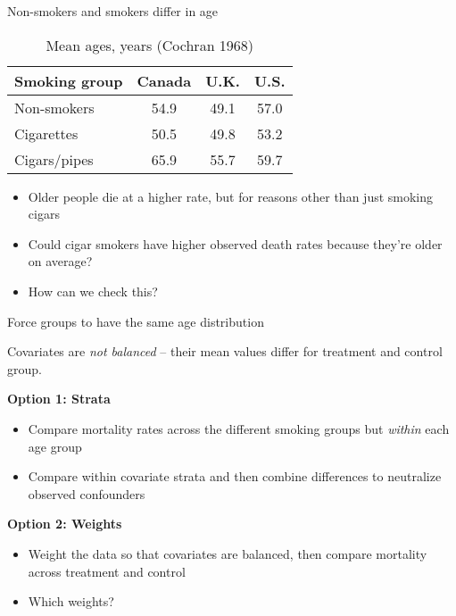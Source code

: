 \documentclass{beamer}
\begin{document}
\begin{frame}{Non-smokers and smokers differ in age}
	


	\begin{table}\centering
		\caption{Mean ages, years (Cochran 1968)}
		\begin{center}
		\begin{tabular}{lccc}
		\hline \hline
		\multicolumn{1}{l}{Smoking group}&
		\multicolumn{1}{c}{Canada}&
		\multicolumn{1}{c}{U.K.}&
		\multicolumn{1}{c}{U.S.}\\
		\hline
		Non-smokers & 54.9 & 49.1 & 57.0\\
		Cigarettes & 50.5 & 49.8 & 53.2 \\
		Cigars/pipes & 65.9 & 55.7 & 59.7\\
		\hline
		\end{tabular}
		\end{center}
	\end{table}
	
	\begin{itemize}
	\item Older people die at a higher rate, but for reasons other than just smoking cigars
	\item Could cigar smokers have higher observed death rates because they're older on average?
	\item How can we check this?
	\end{itemize}
 

\end{frame}

\begin{frame}{Force groups to have the same age distribution}
	
  Covariates are \emph{not balanced} -- their mean values differ for treatment and control group. 

  \bigskip 
  \textbf{Option 1: Strata}
  \begin{itemize}
    \item Compare mortality rates across the different smoking groups but \emph{within} each age group 
    \item Compare within covariate strata and then combine differences to neutralize observed confounders
  \end{itemize}

  \bigskip 
  \textbf{Option 2: Weights}
  \begin{itemize}
    \item Weight the data so that covariates are balanced, then compare mortality across treatment and control
    \item Which weights?
	\end{itemize}
\end{frame}
\end{document}
